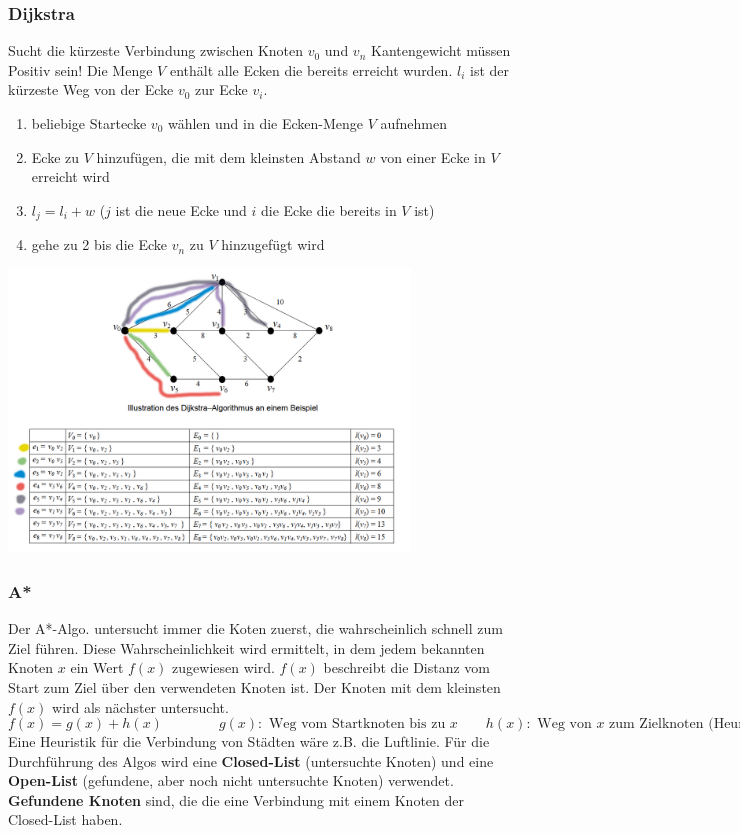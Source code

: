     
\subsubsection{Dijkstra}
Sucht die kürzeste Verbindung zwischen Knoten $v_0$ und $v_n$ Kantengewicht müssen Positiv sein!
Die Menge $V$ enthält alle Ecken die bereits erreicht wurden.
$l_i$ ist der kürzeste Weg von der Ecke $v_0$ zur Ecke $v_i$.

\begin{enumerate}
	\item beliebige Startecke $v_0$ wählen und in die Ecken-Menge $V$ aufnehmen
	\item Ecke zu $V$ hinzufügen, die mit dem kleinsten Abstand $w$ von einer Ecke in $V$ erreicht wird
	\item $l_j = l_i + w$ ($j$ ist die neue Ecke und $i$ die Ecke die bereits in $V$ ist)
	\item gehe zu 2 bis die Ecke $v_n$ zu $V$ hinzugefügt wird
\end{enumerate}

\begin{center}
	\includegraphics[width=0.8\textwidth]{Content/Graphen/Dijkstra.png}
\end{center}


\subsubsection{A*}
Der A*-Algo. untersucht immer die Koten zuerst, die wahrscheinlich schnell zum Ziel führen. Diese Wahrscheinlichkeit wird ermittelt, in dem jedem bekannten Knoten $x$ ein Wert $f(x)$ zugewiesen wird. $f(x)$ beschreibt die Distanz vom Start zum Ziel über den verwendeten Knoten ist. Der Knoten mit dem kleinsten $f(x)$ wird als nächster untersucht.
\[ f(x) = g(x) + h(x) \qquad \qquad g(x): \text{ Weg vom Startknoten bis zu }x  \qquad h(x): \text{ Weg von $x$ zum Zielknoten (Heuristik)}\]
Eine Heuristik für die Verbindung von Städten wäre z.B. die Luftlinie. Für die Durchführung des Algos wird eine \textbf{Closed-List} (untersuchte Knoten) und eine \textbf{Open-List} (gefundene, aber noch nicht untersuchte Knoten) verwendet. \textbf{Gefundene Knoten} sind, die die eine Verbindung mit einem Knoten der Closed-List haben.\\

